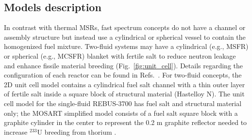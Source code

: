 \documentclass[letterpaper]{mandc2019}
\begin{document}
\subsection{Models description}
\label{sec:model}
In contrast with thermal \gls{MSR}s, fast spectrum concepts do not have a channel or assembly structure but instead use a cylindrical or spherical vessel to contain the homogenized fuel mixture. Two-fluid systems may have a cylindrical (e.g., \gls{MSFR}) or spherical (e.g., \gls{MCSFR}) blanket with fertile salt to reduce neutron leakage and enhance fissile material breeding (Fig.~\ref{fig:unit_cell}). Details regarding the configuration of each reactor can be found in Refs.~\cite{euratom_final_2015, simmons_assessment_1974, mourogov_potentialities_2006-1,ignatiev_molten_2014}. For two-fluid concepts, the 2D unit cell model contains a cylindrical fuel salt channel with a thin outer layer of fertile salt inside a square block of structural material (Hastelloy N). The unit cell model for the single-fluid REBUS-3700 has fuel salt and structural material only; the \gls{MOSART} simplified model consists of a fuel salt square block with a graphite cylinder in the center to represent the 0.2 m graphite reflector needed to increase $^{233}$U breeding from thorium \cite{anshuman_chaube_arfc_2018}.
\end{document}
